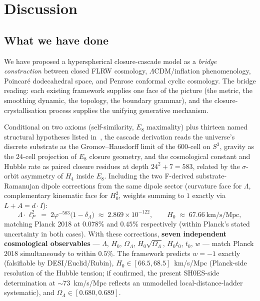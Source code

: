 \documentclass[11pt]{article}
\theoremstyle{plain}
\theoremstyle{definition}
\theoremstyle{remark}
\begin{document}
\section{Discussion}\label{sec:discussion}

\subsection{What we have done}

We have proposed a hyperspherical closure-cascade model as a \emph{bridge construction} between closed FLRW cosmology, $\Lambda$CDM/inflation phenomenology, Poincar\'e dodecahedral space, and Penrose conformal cyclic cosmology. The bridge reading: each existing framework supplies one face of the picture (the metric, the smoothing dynamic, the topology, the boundary grammar), and the closure-crystallisation process supplies the unifying generative mechanism.

Conditional on two axioms (self-similarity, $E_8$ maximality) plus thirteen named structural hypotheses listed in~\citet{SmartXXXVI}, the cascade derivation reads the universe's discrete substrate as the Gromov--Hausdorff limit of the 600-cell on $S^3$, gravity as the 24-cell projection of $E_8$ closure geometry, and the cosmological constant and Hubble rate as paired closure residues at depth $24^2 + 7 = 583$, related by the $\sigma$-orbit asymmetry of $H_4$ inside $E_8$. Including the two F-derived substrate-Ramanujan dipole corrections from the same dipole sector (curvature face for $\Lambda$, complementary kinematic face for $H_0^2$, weights summing to $1$ exactly via $L+A=d\cdot I$):
\[
  \Lambda \cdot \ell_P^2 \;=\; 2 \varphi^{-583}\big(1 - \delta_\Lambda\big) \;\approx\; 2.869 \times 10^{-122}, \qquad H_0 \;\approx\; 67.66~\text{km/s/Mpc},
\]
matching Planck 2018 at $\mathbf{0.078\%}$ and $\mathbf{0.45\%}$ respectively (within Planck's stated uncertainty in both cases). With these corrections, \textbf{seven independent cosmological observables} --- $\Lambda$, $H_0$, $\Omega_\Lambda$, $H_0 \sqrt{\Omega_\Lambda}$, $H_0 t_0$, $t_0$, $w$ --- match Planck 2018 simultaneously to within $\mathbf{0.5\%}$. The framework predicts $w = -1$ exactly (falsifiable by DESI/Euclid/Rubin), $H_0 \in [66.5, 68.5]$~km/s/Mpc (Planck-side resolution of the Hubble tension; if confirmed, the present SH0ES-side determination at $\sim 73$~km/s/Mpc reflects an unmodelled local-distance-ladder systematic), and $\Omega_\Lambda \in [0.680, 0.689]$.
\end{document}
